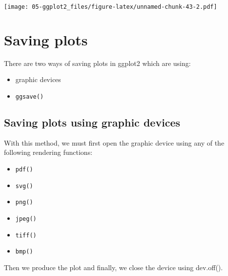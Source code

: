 \documentclass[
]{book}
\providecommand{\tightlist}{%
  \setlength{\itemsep}{0pt}\setlength{\parskip}{0pt}}
\begin{document}
\texttt{[image: 05-ggplot2\_files/figure-latex/unnamed-chunk-43-2.pdf]}

\hypertarget{saving-plots}{%
\section{Saving plots}\label{saving-plots}}

There are two ways of saving plots in ggplot2 which are using:

\begin{itemize}
\tightlist
\item
  graphic devices
\item
  \texttt{ggsave()}
\end{itemize}

\hypertarget{saving-plots-using-graphic-devices}{%
\subsection{Saving plots using graphic devices}\label{saving-plots-using-graphic-devices}}

With this method, we must first open the graphic device using any of the following rendering functions:

\begin{itemize}
\tightlist
\item
  \texttt{pdf()}
\item
  \texttt{svg()}
\item
  \texttt{png()}
\item
  \texttt{jpeg()}
\item
  \texttt{tiff()}
\item
  \texttt{bmp()}
\end{itemize}

Then we produce the plot and finally, we close the device using dev.off().
\end{document}
